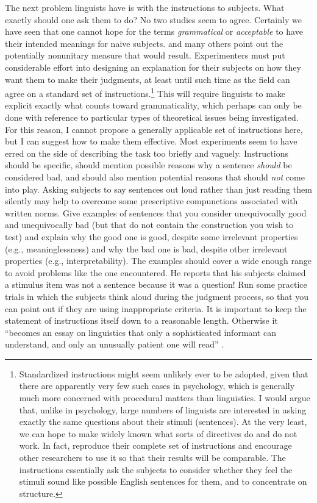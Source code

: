  The next problem linguists have is with the instructions to subjects. What exactly should one ask them to do? No two studies seem to agree. Certainly we have seen that one cannot hope for the terms \textit{grammatical} or \textit{acceptable} to have their intended meanings for naive subjects. \citet{Chaudron1983} and many others point out the potentially nonunitary measure that would result. Experimenters must put considerable effort into designing an explanation for their subjects on how they want them to make their judgments, at least until such time as the field can agree on a standard set of instructions.\footnote{ Standardized instructions might seem unlikely ever to be adopted, given that there are apparently very few such cases in psychology, which is generally much more concerned with procedural matters than linguistics. I would argue that, unlike in psychology, large numbers of linguists are interested in asking exactly the same questions about their stimuli (sentences). At the very least, we can hope to make widely known what sorts of directives do and do not work. In fact, \citet{BleyVromanEtAl1988} reproduce their complete set of instructions and encourage other researchers to use it so that their results will be comparable. The instructions essentially ask the subjects to consider whether they feel the stimuli sound like possible English sentences for them, and to concentrate on structure.
 }
 This will require linguists to make explicit exactly what counts toward grammaticality, which perhaps can only be done with reference to particular types of theoretical issues being investigated. For this reason, I cannot propose a generally applicable set of instructions here, but I can suggest how to make them effective. Most experiments seem to have erred on the side of describing the task too briefly and vaguely. Instructions should be specific, should mention possible reasons why a sentence \textit{should} be considered bad, and should also mention potential reasons that should \textit{not} come into play. Asking subjects to say sentences out loud rather than just reading them silently may help to overcome some prescriptive compunctions associated with written norms. Give examples of sentences that you consider unequivocally good and unequivocally bad (but that do not contain the construction you wish to test) and explain why the good one is good, despite some irrelevant properties (e.g., meaninglessness) and why the bad one is bad, despite other irrelevant properties (e.g., interpretability). The examples should cover a wide enough range to avoid problems like the one \citet{Birdsong1989} encountered. He reports that his subjects claimed a stimulus item was not a sentence because it was a question! Run some practice trials in which the subjects think aloud during the judgment process, so that you can point out if they are using inappropriate criteria. It is important to keep the statement of instructions itself down to a reasonable length. Otherwise it ``becomes an essay on linguistics that only a sophisticated informant can understand, and only an unusually patient one will read'' \citep[296]{Carden1970a}.
